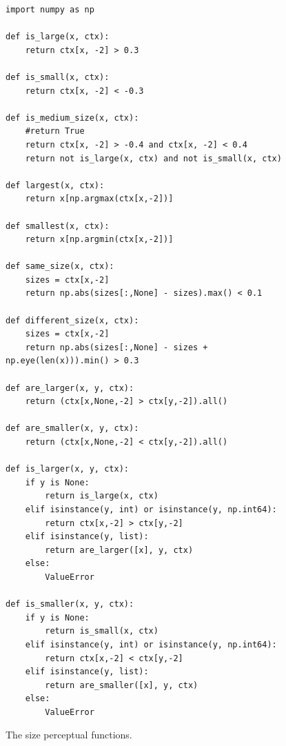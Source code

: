 \documentclass[11pt]{article}
\begin{document}
\begin{figure}
\begin{lstlisting}
import numpy as np

def is_large(x, ctx):
    return ctx[x, -2] > 0.3

def is_small(x, ctx):
    return ctx[x, -2] < -0.3

def is_medium_size(x, ctx):
    #return True
    return ctx[x, -2] > -0.4 and ctx[x, -2] < 0.4
    return not is_large(x, ctx) and not is_small(x, ctx)

def largest(x, ctx):
    return x[np.argmax(ctx[x,-2])]

def smallest(x, ctx):
    return x[np.argmin(ctx[x,-2])]

def same_size(x, ctx):
    sizes = ctx[x,-2] 
    return np.abs(sizes[:,None] - sizes).max() < 0.1

def different_size(x, ctx):
    sizes = ctx[x,-2]
    return np.abs(sizes[:,None] - sizes + np.eye(len(x))).min() > 0.3

def are_larger(x, y, ctx):
    return (ctx[x,None,-2] > ctx[y,-2]).all()

def are_smaller(x, y, ctx):
    return (ctx[x,None,-2] < ctx[y,-2]).all()

def is_larger(x, y, ctx):
    if y is None:
        return is_large(x, ctx)
    elif isinstance(y, int) or isinstance(y, np.int64):
        return ctx[x,-2] > ctx[y,-2]
    elif isinstance(y, list):
        return are_larger([x], y, ctx)
    else:
        ValueError

def is_smaller(x, y, ctx):
    if y is None:
        return is_small(x, ctx)
    elif isinstance(y, int) or isinstance(y, np.int64):
        return ctx[x,-2] < ctx[y,-2]
    elif isinstance(y, list):
        return are_smaller([x], y, ctx)
    else:
        ValueError
\end{lstlisting}
\caption{The size perceptual functions.}
\label{fig:size}
\end{figure}
\end{document}
